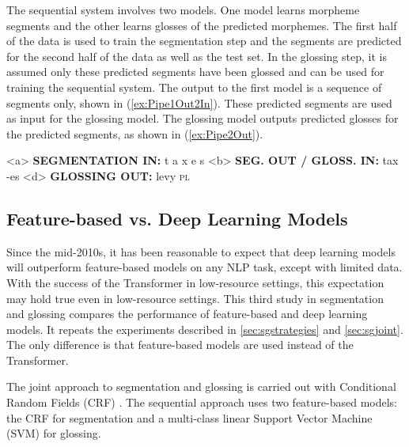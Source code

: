 The sequential system involves two models. One model learns morpheme segments and the other learns glosses of the predicted morphemes. The first half of the data is used to train the segmentation step and the segments are predicted for the second half of the data as well as the test set. In the glossing step, it is assumed only these predicted segments have been glossed and can be used for training the sequential system. The output to the first model is a sequence of segments only, shown in (\ref{ex:Pipe1Out2In}). These predicted segments are used as input for the glossing model. The glossing model outputs predicted glosses for the predicted segments, as shown in (\ref{ex:Pipe2Out}). 

\pex  
\label{ex:Pipe1InOut}
\a<a> \textbf{SEGMENTATION IN:} \hspace{2 mm} t \hspace{2 mm} a \hspace{2 mm} x \hspace{2 mm} e \hspace{2 mm} s 
\label{ex:Pipe1in}
\a<b> \textbf{SEG. OUT / GLOSS. IN:} \hspace{2 mm} tax \hspace{3 mm} -es
\label{ex:Pipe1Out2In}
\a<d> \textbf{GLOSSING OUT:} \hspace{2 mm} levy \hspace{2 mm} \textsc{pl}
\label{ex:Pipe2Out}
\xe


\subsection{Feature-based vs. Deep Learning Models}
\label{sec:CRFvNN}

Since the mid-2010s, it has been reasonable to expect that deep learning models will outperform feature-based models on any NLP task, except with limited data. With the success of the Transformer \citep{vaswani_attention_2017} in low-resource settings, this expectation may hold true even in low-resource settings. This third study in segmentation and glossing compares the performance of feature-based and deep learning models. It repeats the experiments described in \autoref{sec:sgstrategies} and \autoref{sec:sgjoint}. The only difference is that feature-based models are used instead of the Transformer.

The joint approach to segmentation and glossing is carried out with Conditional Random Fields (CRF) \citep{lafferty_conditional_2001}. The sequential approach uses two feature-based models: the CRF for segmentation and a multi-class linear Support Vector Machine (SVM) for glossing. 

